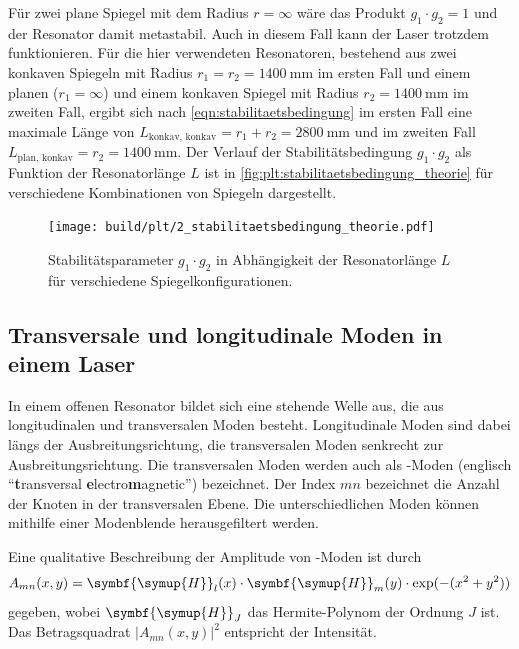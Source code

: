     Für zwei plane Spiegel mit dem Radius $r = \infty$ wäre das Produkt $g_1 \cdot g_2 = 1$ und der Resonator damit metastabil.
    Auch in diesem Fall kann der Laser trotzdem funktionieren.
    Für die hier verwendeten Resonatoren,
    bestehend aus zwei konkaven Spiegeln mit Radius $r_1 = r_2 = \SI{1400}{\milli\meter}$ im ersten Fall
    und einem planen ($r_1 = \infty$) und einem konkaven Spiegel mit Radius $r_2 = \SI{1400}{\milli\meter}$ im zweiten Fall,
    ergibt sich nach \autoref{eqn:stabilitaetsbedingung} im ersten Fall eine maximale Länge von $L_\text{konkav, konkav} = r_1 + r_2 = \SI{2800}{\milli\meter}$
    und im zweiten Fall $L_\text{plan, konkav} = r_2 = \SI{1400}{\milli\meter}$.
    Der Verlauf der Stabilitätsbedingung $g_1 \cdot g_2$ als Funktion der Resonatorlänge $L$ ist in \autoref{fig:plt:stabilitaetsbedingung_theorie}
    für verschiedene Kombinationen von Spiegeln dargestellt.

    \begin{figure}[H]
        \centering
        \texttt{[image: build/plt/2\_stabilitaetsbedingung\_theorie.pdf]}
        \caption{Stabilitätsparameter $g_1 \cdot g_2$ in Abhängigkeit der Resonatorlänge $L$ für verschiedene Spiegelkonfigurationen.}
        \label{fig:plt:stabilitaetsbedingung_theorie}
    \end{figure}



\subsection{Transversale und longitudinale Moden in einem Laser}
\label{sec:moden}

    In einem offenen Resonator bildet sich eine stehende Welle aus,
    die aus longitudinalen und transversalen Moden besteht.
    Longitudinale Moden sind dabei längs der Ausbreitungsrichtung,
    die transversalen Moden senkrecht zur Ausbreitungsrichtung.
    Die transversalen Moden werden auch als -Moden (englisch \enquote{\textbf{t}ransversal \textbf{e}lectro\textbf{m}agnetic}) bezeichnet.
    Der Index $mn$ bezeichnet die Anzahl der Knoten in der transversalen Ebene.
    Die unterschiedlichen Moden können mithilfe einer Modenblende herausgefiltert werden.

    Eine qualitative Beschreibung der Amplitude von -Moden ist durch
    \def\H{\symbf{\symup{H}}}
    \begin{equation}
        A_{mn}(x, y) =
        \H_l(x) \cdot \H_m(y) \cdot \exp(-(x^2 + y^2))
        \label{eqn:tem}
    \end{equation}
    gegeben,
    wobei $\H_J$ das Hermite-Polynom der Ordnung $J$ ist.
    Das Betragsquadrat $|A_{mn}(x, y)|^2$ entspricht der Intensität.



